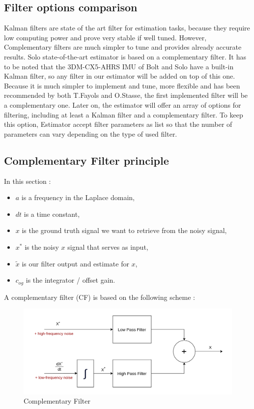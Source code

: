 \documentclass[a4paper,10pt]{article}
\begin{document}
\subsection{Filter options comparison}

Kalman filters are state of the art filter for estimation tasks, because they require low computing power and prove very stable if well tuned. However, Complementary filters are much simpler to tune and provides already accurate results. Solo state-of-the-art estimator is based on a complementary filter. It has to be noted that the 3DM-CX5-AHRS IMU of Bolt and Solo have a built-in Kalman filter, so any filter in our estimator will be added on top of this one. Because it is much simpler to implement and tune, more flexible and has been recommended by both T.Fayols and O.Stasse, the first implemented filter will be a complementary one. Later on, the estimator will offer an array of options for filtering, including at least a Kalman filter and a complementary filter. To keep this option, Estimator accept filter parameters as list so that the number of parameters can vary depending on the type of used filter.

\subsection{Complementary Filter principle}
\label{complementary filter principle}
In this section :
\begin{itemize}[noitemsep,topsep=0.5pt,parsep=0.1pt,partopsep=0.1pt]
\item $a$ is a frequency in the Laplace domain,
\item $dt$ is a time constant,
\item $x$ is the ground truth signal we want to retrieve from the noisy signal,
\item $x^*$ is the noisy $x$ signal that serves as input,
\item $\widetilde{x}$ is our filter output and estimate for $x$,
\item $c_{og}$ is the integrator / offset gain.

\end{itemize}
A complementary filter (CF) is based on the following scheme \cite{CF_Kung}:
\begin{figure}[H]
\label{fig:complementary_filter_principle}
\centering
  \includegraphics[width=\linewidth, angle=0, scale=0.8]{./images/CF*.png}
  \caption{Complementary Filter}
\end{figure}
\end{document}

